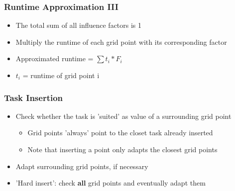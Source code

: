 \begin{frame}
\begin{minipage}[t]{0.60\linewidth}
	\end{minipage}\hfill
\end{frame}

\begin{frame}
	\frametitle {Runtime Approximation III}	
		\begin{itemize}
			\item<2->{The total sum of all influence factors is 1}
			\item<3->{Multiply the runtime of each grid point with its corresponding factor}
			\item<4->{Approximated runtime = $\sum t_i * F_i$}
			\item<5->{$t_i$ = runtime of grid point i}					
		\end{itemize}				
\end{frame}

\begin{frame}
	\frametitle{Task Insertion}
		\begin{itemize}
			\item<2->{Check whether the task is 'suited' as value of a 													surrounding grid point}
			\begin{itemize}
				\item<3->{Grid points 'always' point to the closet task already inserted}
				\item<4->{Note that inserting a point only adapts the 														closest grid points}
			\end{itemize}
			\item<5->{Adapt surrounding grid points, if necessary}
		\end{itemize}
		
		\begin{itemize}
			\item<6->{'Hard insert': check \textbf{all} grid points and eventually adapt them}
		\end{itemize}	
\end{frame}

